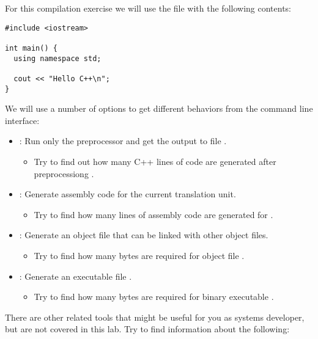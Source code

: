 For this compilation exercise we will use the  file with the following contents:

\begin{lstlisting}
#include <iostream>

int main() {
  using namespace std;

  cout << "Hello C++\n";
}
\end{lstlisting}

We will use a number of options to get different behaviors from the  command line interface:

\begin{itemize}
  \item {}: 
  Run only the preprocessor and get the output to file .
    \begin{itemize}
      \item Try to find out how many C++ lines of code are generated after preprocessiong .
    \end{itemize}

  \item {}:
  Generate assembly code for the current translation unit.
    \begin{itemize}
      \item Try to find how many lines of assembly code are generated for .
    \end{itemize}

  \item {}:
  Generate an object file  that can be linked with other object files.
    \begin{itemize}
      \item Try to find how many bytes are required for object file .
    \end{itemize}

  \item {}:
  Generate an executable file .
    \begin{itemize}
      \item Try to find how many bytes are required for binary executable .
    \end{itemize}
\end{itemize}

There are other related tools that might be useful for you as systems developer, but are not
covered in this lab. Try to find information about the following:

